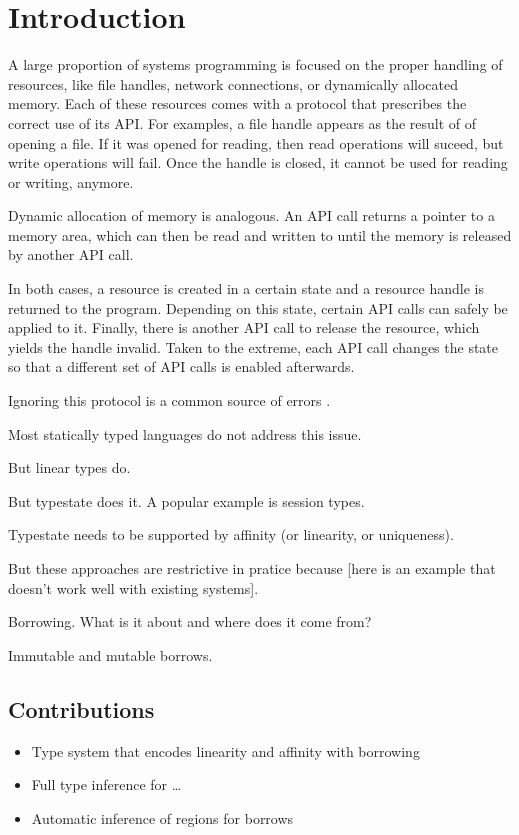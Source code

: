 \section{Introduction}

A large proportion of systems programming is focused on the proper
handling of resources, like file handles, network connections, or
dynamically allocated memory. Each of these resources comes with a
protocol that prescribes the correct use of its API.
For examples, a file handle appears as the result of of opening a
file. If it was opened for reading, then read operations will suceed,
but write operations will fail. Once the handle is closed, it cannot
be used for reading or writing, anymore.

Dynamic allocation of memory is analogous. An API call returns a
pointer to a memory area, which can then be read and written to until
the memory is released by another API call.

In both cases, a resource is created in a certain state and a resource
handle is returned to the program. Depending on this state, certain API calls
can safely be applied to it. Finally, there is another API call to
release the resource, which yields the handle invalid.
Taken to the extreme, each API call changes the state so that a
different set of API calls is enabled afterwards. 

Ignoring this protocol is a common source of errors
\cite{is-there-some-paper?}.

Most statically typed languages do not address this issue.

But linear types do.

But typestate does it. A popular example is session types.

Typestate needs to be supported by affinity (or linearity, or
uniqueness).

But these approaches are restrictive in pratice because [here is an
example that doesn't work well with existing systems].

Borrowing. What is it about and where does it come from?

Immutable and mutable borrows.

\subsection{Contributions}
\label{sec:contributions}

\begin{itemize}
\item Type system that encodes linearity and affinity with borrowing
\item Full type inference for \dots
\item Automatic inference of regions for borrows
\end{itemize}

